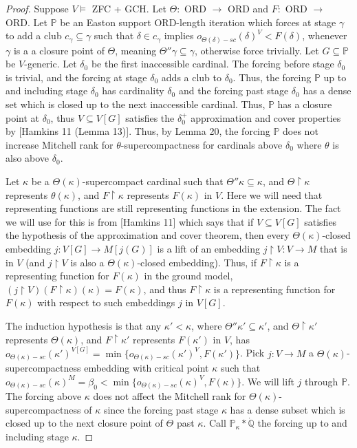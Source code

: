 \documentclass[10pt,a4paper]{amsart}
\begin{document}
\begin{proof} Suppose $V \models$ ZFC + GCH. Let $\Theta:$ ORD $\to$ ORD and $F:$ ORD $\to$ ORD. Let $\mathbb{P}$ be an Easton support ORD-length iteration which forces at stage $\gamma$ to add a club $c_{\gamma} \subseteq \gamma$ such that $\delta \in c_{\gamma}$ implies $o_{\Theta(\delta)-sc}(\delta)^V < F(\delta)$, whenever $\gamma$ is a a closure point of $\Theta$, meaning $\Theta''\gamma \subseteq \gamma$, otherwise force trivially. Let $G \subseteq \mathbb{P}$ be $V$-generic. Let $\delta_0$ be the first inaccessible cardinal. The forcing before stage $\delta_0$ is trivial, and the forcing at stage $\delta_0$ adds a club to $\delta_0$. Thus, the forcing $\mathbb{P}$ up to and including stage $\delta_0$ has cardinality $\delta_0$ and the forcing past stage $\delta_0$ has a dense set which is closed up to the next inaccessible cardinal. Thus, $\mathbb{P}$ has a closure point at $\delta_0$, thus $V \subseteq V[G]$ satisfies the $\delta_0^+$ approximation and cover properties by [Hamkins 11 (Lemma 13)]. Thus, by Lemma 20, the forcing $\mathbb{P}$ does not increase Mitchell rank for $\theta$-supercompactness for cardinals above $\delta_0$ where $\theta$ is also above $\delta_0$. 

Let $\kappa$ be a $\Theta(\kappa)$-supercompact cardinal such that $\Theta''\kappa \subseteq \kappa$, and $\Theta \upharpoonright \kappa$ represents $\theta(\kappa)$, and $F \upharpoonright \kappa$ represents $F(\kappa)$ in $V$. Here we will need that representing functions are still representing functions in the extension. The fact we will use for this is from [Hamkins 11] which says that if $V \subseteq V[G]$ satisfies the hypothesis of the approximation and cover theorem, then every $\Theta(\kappa)$-closed embedding $j:V[G] \to M[j(G)]$ is a lift of an embedding $j \upharpoonright V : V \to M$ that is in $V$ (and $j \upharpoonright V$ is also a $\Theta(\kappa)$-closed embedding). Thus, if $F \upharpoonright \kappa$ is a representing function for $F(\kappa)$ in the ground model, $(j \upharpoonright V)(F \upharpoonright \kappa)(\kappa) = F(\kappa)$, and thus $F \upharpoonright \kappa$ is a representing function for $F(\kappa)$ with respect to such embeddings $j$
 in $V[G]$. 

 The induction hypothesis is that any $\kappa' < \kappa$, where $\Theta''\kappa' \subseteq \kappa'$, and $\Theta \upharpoonright \kappa'$ represents $\Theta(\kappa)$, and $F \upharpoonright \kappa'$ represents $F(\kappa')$ in $V$, has $o_{\Theta(\kappa)-sc}(\kappa')^{V[G]} = \min\{o_{\Theta(\kappa)-sc}(\kappa')^V, F(\kappa')\}$. Pick $j:V \to M$ a $\Theta(\kappa)$-supercompactness embedding with critical point $\kappa$ such that $o_{\Theta(\kappa)-sc}(\kappa)^M = \beta_0 < \min\{o_{\Theta(\kappa)-sc}(\kappa)^V, F(\kappa)\}$. We will lift $j$ through $\mathbb{P}$. The forcing above $\kappa$ does not affect the Mitchell rank for $\Theta(\kappa)$-supercompactness of $\kappa$ since the forcing past stage $\kappa$ has a dense subset which is closed up to the next closure point of $\Theta$ past $\kappa$. Call $\mathbb{P}_{\kappa}*\dot{\mathbb{Q}}$ the forcing up to and including stage $\kappa$.


\end{proof}
\end{document}
